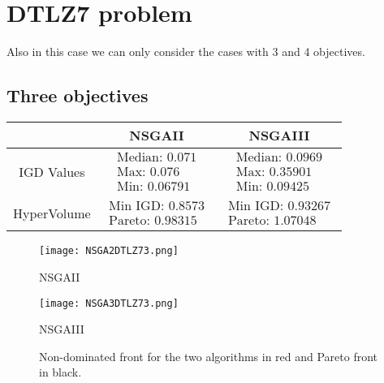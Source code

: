 \documentclass[a4paper,11pt]{article}
\numberwithin{equation}{section}
\begin{document}
\newpage

\section{DTLZ7 problem}

Also in this case we can only consider the cases with 3 and 4 objectives.

\subsection{Three objectives}

\begin{table}[!h]
\begin{center}
\begin{tabular}{|c|c|c|}
\hline
 & NSGAII & NSGAIII \\
\hline
IGD Values &$\begin{array}{l}
\text{Median: 0.071}\\
\text{Max: 0.076}\\
\text{Min: 0.06791}\end{array}$&
$\begin{array}{l}
\text{Median: 0.0969}\\
\text{Max: 0.35901}\\
\text{Min: 0.09425}\end{array}$\\
\hline
HyperVolume &$\begin{array}{l}
\text{Min IGD: 0.8573}\\
\text{Pareto: 0.98315}\end{array}$&
$\begin{array}{l}
\text{Min IGD: 0.93267}\\
\text{Pareto: 1.07048}\end{array}$\\
\hline
\end{tabular}
\end{center}
\end{table}

\begin{figure}[h]
        \centering
        \begin{minipage}{0.48\textwidth} 
            \centering
            \texttt{[image: NSGA2DTLZ73.png]} 
            \caption*{NSGAII}
        \end{minipage}
        \hfill
        \begin{minipage}{0.48\textwidth} 
            \centering
            \texttt{[image: NSGA3DTLZ73.png]} 
            \caption*{NSGAIII} 
        \end{minipage}
        \caption{Non-dominated front for the two algorithms in red and Pareto front in black. } 
    \end{figure}
\end{document}
